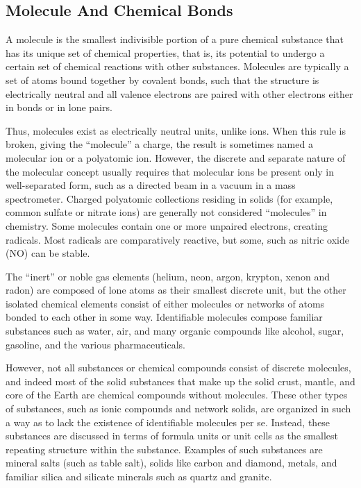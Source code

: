 \documentclass[
]{article}
\begin{document}
\hypertarget{molecule-and-chemical-bonds}{%
\subsection{Molecule And Chemical
Bonds}\label{molecule-and-chemical-bonds}}

A molecule is the smallest indivisible portion of a pure chemical
substance that has its unique set of chemical properties, that is, its
potential to undergo a certain set of chemical reactions with other
substances. Molecules are typically a set of atoms bound together by
covalent bonds, such that the structure is electrically neutral and all
valence electrons are paired with other electrons either in bonds or in
lone pairs.

Thus, molecules exist as electrically neutral units, unlike ions. When
this rule is broken, giving the ``molecule'' a charge, the result is
sometimes named a molecular ion or a polyatomic ion. However, the
discrete and separate nature of the molecular concept usually requires
that molecular ions be present only in well-separated form, such as a
directed beam in a vacuum in a mass spectrometer. Charged polyatomic
collections residing in solids (for example, common sulfate or nitrate
ions) are generally not considered ``molecules'' in chemistry. Some
molecules contain one or more unpaired electrons, creating radicals.
Most radicals are comparatively reactive, but some, such as nitric oxide
(NO) can be stable.

The ``inert'' or noble gas elements (helium, neon, argon, krypton, xenon
and radon) are composed of lone atoms as their smallest discrete unit,
but the other isolated chemical elements consist of either molecules or
networks of atoms bonded to each other in some way. Identifiable
molecules compose familiar substances such as water, air, and many
organic compounds like alcohol, sugar, gasoline, and the various
pharmaceuticals.

However, not all substances or chemical compounds consist of discrete
molecules, and indeed most of the solid substances that make up the
solid crust, mantle, and core of the Earth are chemical compounds
without molecules. These other types of substances, such as ionic
compounds and network solids, are organized in such a way as to lack the
existence of identifiable molecules per se. Instead, these substances
are discussed in terms of formula units or unit cells as the smallest
repeating structure within the substance. Examples of such substances
are mineral salts (such as table salt), solids like carbon and diamond,
metals, and familiar silica and silicate minerals such as quartz and
granite.
\end{document}
